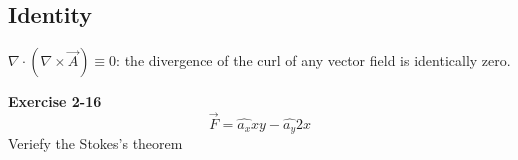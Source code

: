 \documentclass[12pt, a4paper]{article}
\begin{document}
\subsection*{Identity }
$\nabla \cdot (\nabla \times \vec{A}) \equiv 0$: the divergence of the curl of any vector field is identically zero.
\newpage

\textbf{Exercise 2-16} \\
$$
\vec{F} = \hat{a_x}xy - \hat{a_y}2x
$$
Veriefy the Stokes's theorem


\begin{tikzpicture}[x=0.75pt,y=0.75pt,yscale=-1,xscale=1]


\end{tikzpicture}
\end{document}
